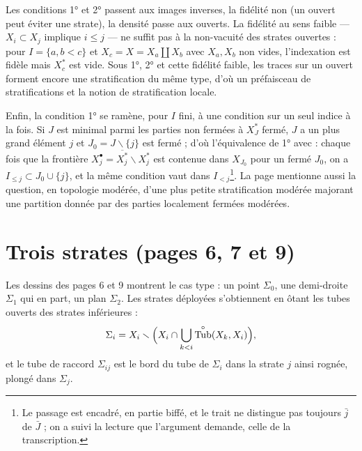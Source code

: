 \documentclass[11pt,a4paper]{article}
\begin{document}
Les conditions 1° et 2° passent aux images inverses, la fidélité non (un ouvert
peut éviter une strate), la densité passe aux ouverts. La fidélité au sens faible
— $X_i \subset X_j$ implique $i \leq j$ — ne suffit pas à la non-vacuité des
strates ouvertes : pour $I = \{a, b < c\}$ et $X_c = X = X_a \amalg X_b$ avec
$X_a, X_b$ non vides, l'indexation est fidèle mais $X^{*}_c$ est vide. Sous 1°,
2° et cette fidélité faible, les traces sur un ouvert forment encore une
stratification du même type, d'où un préfaisceau de stratifications et la notion
de stratification locale.

Enfin, la condition 1° se ramène, pour $I$ fini, à une condition sur un seul
indice à la fois. Si $J$ est minimal parmi les parties non fermées à $X^{*}_J$
fermé, $J$ a un plus grand élément $j$ et $J_0 = J \smallsetminus \{j\}$ est
fermé ; d'où l'équivalence de 1° avec : chaque fois que la frontière $X^{\bullet}_j
= \overline{X^{*}_j} \smallsetminus X^{*}_j$ est contenue dans $X_{J_0}$ pour un
fermé $J_0$, on a $I_{\leq j} \subset J_0 \cup \{j\}$, et la même condition vaut
dans $I_{<j}$\footnote{Le passage est encadré, en partie biffé, et le trait ne
distingue pas toujours $\bar j$ de $\bar J$ ; on a suivi la lecture que l'argument
demande, celle de la transcription.}. La page mentionne aussi la question, en
topologie modérée, d'une plus petite stratification modérée majorant une
partition donnée par des parties localement fermées modérées.

\section*{Trois strates (pages 6, 7 et 9)}

Les dessins des pages 6 et 9 montrent le cas type : un point $\Sigma_0$, une demi-droite
$\Sigma_1$ qui en part, un plan $\Sigma_2$. Les strates déployées s'obtiennent en
ôtant les tubes ouverts des strates inférieures :
\[
\Sigma_i = X_i \smallsetminus \Bigl(X_i \cap \bigcup_{k<i}
\overset{\circ}{\mathrm{Tub}}(X_k, X_i)\Bigr),
\]
et le tube de raccord $\Sigma_{ij}$ est le bord du tube de $\Sigma_i$ dans la strate
$j$ ainsi rognée, plongé dans $\Sigma_j$.
\end{document}

